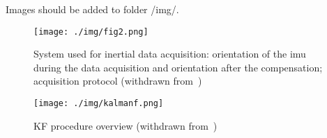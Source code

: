 Images should be added to folder /img/.


\begin{figure*} 
\centering
    \texttt{[image: ./img/fig2.png]}
  \caption{System used for inertial
    data acquisition: orientation of the \gls{imu} during the data acquisition
    and orientation after the compensation; acquisition protocol (withdrawn from~\cite{cav-enunc})}%
\label{fig:fig2}
\end{figure*}

\begin{figure}
\centering
    \texttt{[image: ./img/kalmanf.png]}
  \caption{KF procedure overview (withdrawn from~\cite{mccarron2013low})}%
\label{fig:kalmanf}
\end{figure}



